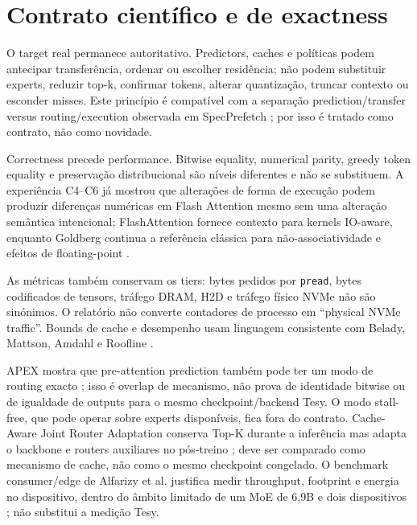 \section{Contrato científico e de exactness}
O target real permanece autoritativo. Predictors, caches e políticas podem antecipar transferência, ordenar ou escolher residência; não podem substituir experts, reduzir top-k, confirmar tokens, alterar quantização, truncar contexto ou esconder misses. Este princípio é compatível com a separação prediction/transfer versus routing/execution observada em SpecPrefetch \cite{kong2026specprefetch}; por isso é tratado como contrato, não como novidade.

Correctness precede performance. Bitwise equality, numerical parity, greedy token equality e preservação distribucional são níveis diferentes e não se substituem. A experiência C4--C6 já mostrou que alterações de forma de execução podem produzir diferenças numéricas em Flash Attention mesmo sem uma alteração semântica intencional; FlashAttention fornece contexto para kernels IO-aware, enquanto Goldberg continua a referência clássica para não-associatividade e efeitos de floating-point \cite{dao2022flashattention,goldberg1991floating}.

As métricas também conservam os tiers: bytes pedidos por \texttt{pread}, bytes codificados de tensors, tráfego DRAM, H2D e tráfego físico NVMe não são sinónimos. O relatório não converte contadores de processo em “physical NVMe traffic”. Bounds de cache e desempenho usam linguagem consistente com Belady, Mattson, Amdahl e Roofline \cite{belady1966replacement,mattson1970storage,amdahl1967validity,williams2009roofline}.

APEX mostra que pre-attention prediction também pode ter um modo de routing exacto \cite{kanani2026apex}; isso é overlap de mecanismo, não prova de identidade bitwise ou de igualdade de outputs para o mesmo checkpoint/backend Tesy. O modo stall-free, que pode operar sobre experts disponíveis, fica fora do contrato. Cache-Aware Joint Router Adaptation conserva Top-K durante a inferência mas adapta o backbone e routers auxiliares no pós-treino \cite{wu2026cacheaware}; deve ser comparado como mecanismo de cache, não como o mesmo checkpoint congelado. O benchmark consumer/edge de Alfarizy et al. justifica medir throughput, footprint e energia no dispositivo, dentro do âmbito limitado de um MoE de 6,9B e dois dispositivos \cite{alfarizy2026consumer}; não substitui a medição Tesy.
